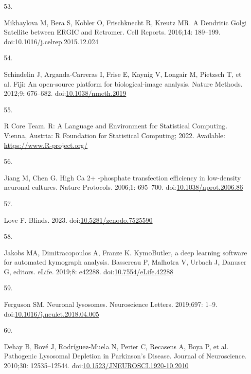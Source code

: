 \documentclass[
  12pt,
  a4paper,
]{book}
\newlength{\cslhangindent}
\newlength{\csllabelwidth}
\newlength{\cslentryspacingunit} %
\newenvironment{CSLReferences}[2] %
 {%
  \setlength{\parindent}{0pt}
  \ifodd #1
  \let\oldpar\par
  \def\par{\hangindent=\cslhangindent\oldpar}
  \fi
  \setlength{\parskip}{#2\cslentryspacingunit}
 }%
 {}
\newcommand{\CSLLeftMargin}[1]{\parbox[t]{\csllabelwidth}{#1}}
\newcommand{\CSLRightInline}[1]{\parbox[t]{\linewidth - \csllabelwidth}{#1}\break}
\begin{document}
\begin{CSLReferences}{0}{0}
\leavevmode{}%
\CSLLeftMargin{53. }%
\CSLRightInline{Mikhaylova M, Bera S, Kobler O, Frischknecht R, Kreutz MR. A {Dendritic Golgi Satellite} between {ERGIC} and {Retromer}. Cell Reports. 2016;14: 189--199. doi:\href{https://doi.org/10.1016/j.celrep.2015.12.024}{10.1016/j.celrep.2015.12.024}}

\leavevmode{}%
\CSLLeftMargin{54. }%
\CSLRightInline{Schindelin J, Arganda-Carreras I, Frise E, Kaynig V, Longair M, Pietzsch T, et al. Fiji: An open-source platform for biological-image analysis. Nature Methods. 2012;9: 676--682. doi:\href{https://doi.org/10.1038/nmeth.2019}{10.1038/nmeth.2019}}

\leavevmode{}%
\CSLLeftMargin{55. }%
\CSLRightInline{R Core Team. R: {A Language} and {Environment} for {Statistical Computing}. {Vienna, Austria}: {R Foundation for Statistical Computing}; 2022. Available: \url{https://www.R-project.org/}}

\leavevmode{}%
\CSLLeftMargin{56. }%
\CSLRightInline{Jiang M, Chen G. High {Ca} 2+ -phosphate transfection efficiency in low-density neuronal cultures. Nature Protocols. 2006;1: 695--700. doi:\href{https://doi.org/10.1038/nprot.2006.86}{10.1038/nprot.2006.86}}

\leavevmode{}%
\CSLLeftMargin{57. }%
\CSLRightInline{Love F. Blinds. 2023. doi:\href{https://doi.org/10.5281/zenodo.7525590}{10.5281/zenodo.7525590}}

\leavevmode{}%
\CSLLeftMargin{58. }%
\CSLRightInline{Jakobs MA, Dimitracopoulos A, Franze K. {KymoButler}, a deep learning software for automated kymograph analysis. Bassereau P, Malhotra V, Urbach J, Danuser G, editors. eLife. 2019;8: e42288. doi:\href{https://doi.org/10.7554/eLife.42288}{10.7554/eLife.42288}}

\leavevmode{}%
\CSLLeftMargin{59. }%
\CSLRightInline{Ferguson SM. Neuronal lysosomes. Neuroscience Letters. 2019;697: 1--9. doi:\href{https://doi.org/10.1016/j.neulet.2018.04.005}{10.1016/j.neulet.2018.04.005}}

\leavevmode{}%
\CSLLeftMargin{60. }%
\CSLRightInline{Dehay B, Bové J, Rodríguez-Muela N, Perier C, Recasens A, Boya P, et al. Pathogenic {Lysosomal Depletion} in {Parkinson}'s {Disease}. Journal of Neuroscience. 2010;30: 12535--12544. doi:\href{https://doi.org/10.1523/JNEUROSCI.1920-10.2010}{10.1523/JNEUROSCI.1920-10.2010}}


\end{CSLReferences}
\end{document}

